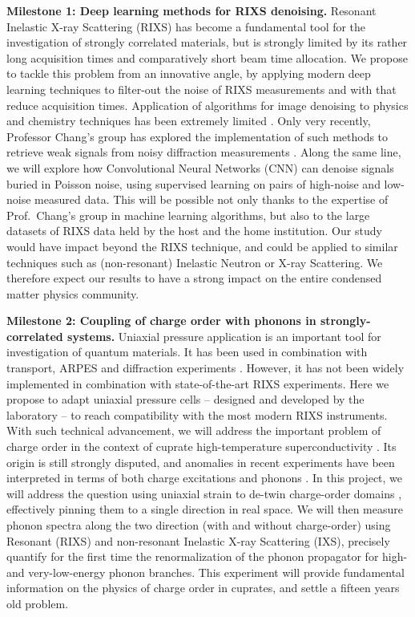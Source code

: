 \documentclass[a4paper, 12pt]{article}
\begin{document}
\medskip

{\bfseries Milestone 1: Deep learning methods for RIXS denoising.} \newline
Resonant Inelastic X-ray Scattering (RIXS) has become a fundamental tool for the investigation of strongly correlated materials, but is strongly limited by its rather long acquisition times and comparatively short beam time allocation. We propose to tackle this problem from an innovative angle, by applying modern deep learning techniques to filter-out the noise of RIXS measurements and with that reduce acquisition times. Application of algorithms for image denoising to physics and chemistry techniques has been extremely limited \cite{valensise2020removing}.
Only very recently, Professor Chang’s group has explored the implementation of such methods to retrieve weak signals from noisy diffraction measurements \cite{oppliger2022weak}. Along the same line, we will explore how Convolutional Neural Networks (CNN) can denoise signals buried in Poisson noise, using supervised learning on pairs of high-noise and low-noise measured data. 
This will be possible not only thanks to the expertise of Prof.~Chang’s group in machine learning algorithms, but also to the large datasets of RIXS data held by the host and the home institution. Our study would have impact beyond the RIXS technique, and could be applied to similar techniques such as (non-resonant) Inelastic Neutron or X-ray Scattering. We therefore expect our results to have a strong impact on the entire condensed matter physics community.

\medskip

{\bfseries Milestone 2: Coupling of charge order with phonons in strongly-correlated systems.}
Uniaxial pressure application is an important tool for investigation of quantum materials. It has been used in combination with transport, ARPES and diffraction experiments \cite{lin2021visualization, arpaia2019dynamical, wang2022uniaxial}. However, it has not been widely implemented in combination with state-of-the-art RIXS experiments. Here we propose to adapt uniaxial pressure cells – designed and developed by the laboratory – to reach compatibility with the most modern RIXS instruments. With such technical advancement, we will address the important problem of charge order in the context of cuprate high-temperature superconductivity \cite{cubrovic2009string, arpaia2019dynamical}. Its origin is still strongly disputed, and anomalies in recent experiments have been interpreted in terms of both charge excitations \cite{chaix2017dispersive,li2020multiorbital} and phonons \cite{wang2021charge}. In this project, we will address the question using uniaxial strain to de-twin charge-order domains \cite{wang2022uniaxial}, effectively pinning them to a single direction in real space. We will then measure phonon spectra along the two direction (with and without charge-order) using Resonant (RIXS) and non-resonant Inelastic X-ray Scattering (IXS), precisely quantify for the first time the renormalization of the phonon propagator for high- and very-low-energy phonon branches. This experiment will provide fundamental information on the physics of charge order in cuprates, and settle a fifteen years old problem.
\end{document}
